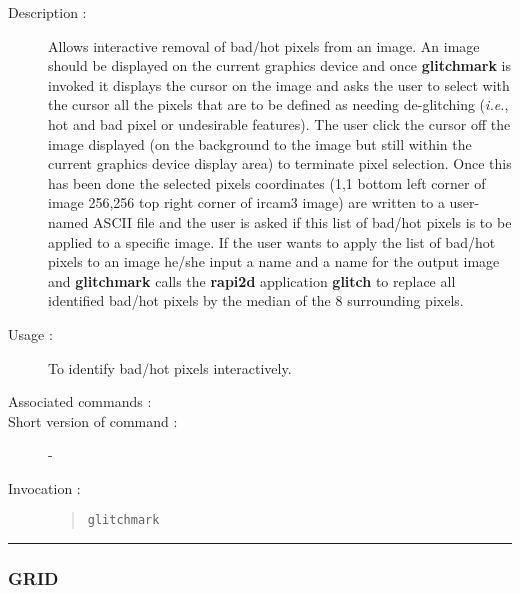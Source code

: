 \begin{description}

\item[Description :] Allows interactive removal of bad/hot
pixels from an image.  An image should be displayed on the current
graphics device and once {\bf glitchmark} is invoked it displays the cursor
on the image and asks the user to select with the cursor all the pixels
that are to be defined as needing de-glitching (\emph{i.e.}, hot and
bad pixel or undesirable features).  The user click the cursor off the
image displayed (on the background to the image but still within the
current graphics device display area) to terminate pixel selection.
Once this has been done the selected pixels coordinates (1,1 bottom
left corner of image 256,256 top right corner of {\sc ircam3} image)
are written to a user-named ASCII file and the user is asked if this
list of bad/hot pixels is to be applied to a specific image.  If the
user wants to apply the list of bad/hot pixels to an image he/she input
a name and a name for the output image and {\bf glitchmark} calls the {\bf
rapi2d} application {\bf glitch} to replace all identified bad/hot pixels by
the median of the 8 surrounding pixels.

\item[Usage :] To identify bad/hot pixels interactively.
\item[Associated commands :] {\tt {}}
\item[Short version of command :] -
\item[Invocation :]

\begin{quote}{\tt  glitchmark }\end{quote}

\end{description}

\hrule 
\subsubsection*{\label{GRID}GRID}

